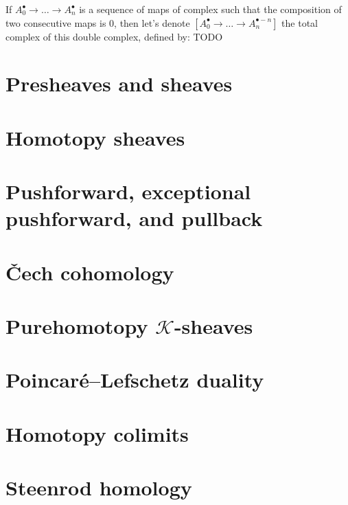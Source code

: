 %

\begin{definition}\label{def:total_complex}
    If $A_0^{\bullet}\to\ldots \to A_n^{\bullet}$ is a sequence of maps of complex such that the composition of two consecutive maps is $0$, then let's denote $[A_0^{\bullet}\to\ldots \to A_n^{\bullet-n}]$ the total complex of this double complex, defined by: TODO
\end{definition}

\chapter{Presheaves and sheaves}



\chapter{Homotopy sheaves}



\chapter{Pushforward, exceptional pushforward, and pullback}



\chapter{\v{C}ech cohomology}



\chapter{Purehomotopy $\mathcal{K}$-sheaves}



\chapter{Poincaré–Lefschetz duality}



\chapter{Homotopy colimits}



\chapter{Steenrod homology}





